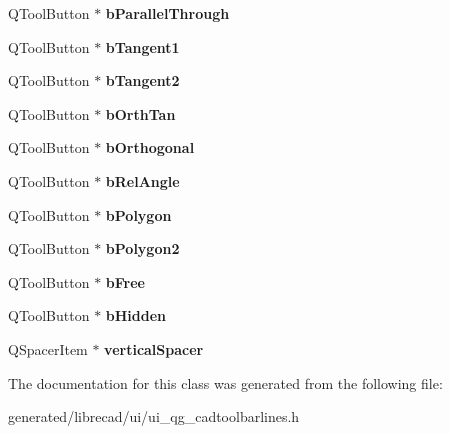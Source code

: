 \begin{DoxyCompactItemize}
\item 
\hypertarget{classUi__QG__CadToolBarLines_a97b59bf8eac8024b00acc25a7309fd08}{Q\-Tool\-Button $\ast$ {\bfseries b\-Parallel\-Through}}\label{classUi__QG__CadToolBarLines_a97b59bf8eac8024b00acc25a7309fd08}

\item 
\hypertarget{classUi__QG__CadToolBarLines_afc240331b0379d49489c3bef235bb491}{Q\-Tool\-Button $\ast$ {\bfseries b\-Tangent1}}\label{classUi__QG__CadToolBarLines_afc240331b0379d49489c3bef235bb491}

\item 
\hypertarget{classUi__QG__CadToolBarLines_a46fa22d7d353f8f2fa12a13513615312}{Q\-Tool\-Button $\ast$ {\bfseries b\-Tangent2}}\label{classUi__QG__CadToolBarLines_a46fa22d7d353f8f2fa12a13513615312}

\item 
\hypertarget{classUi__QG__CadToolBarLines_aeb0c7487faf56ab5ac0f88f3f0be7882}{Q\-Tool\-Button $\ast$ {\bfseries b\-Orth\-Tan}}\label{classUi__QG__CadToolBarLines_aeb0c7487faf56ab5ac0f88f3f0be7882}

\item 
\hypertarget{classUi__QG__CadToolBarLines_a3fe0ab2bc133eea4d28a8b8bf8d38625}{Q\-Tool\-Button $\ast$ {\bfseries b\-Orthogonal}}\label{classUi__QG__CadToolBarLines_a3fe0ab2bc133eea4d28a8b8bf8d38625}

\item 
\hypertarget{classUi__QG__CadToolBarLines_a2cc3cdddb2b33b193b6089c310471554}{Q\-Tool\-Button $\ast$ {\bfseries b\-Rel\-Angle}}\label{classUi__QG__CadToolBarLines_a2cc3cdddb2b33b193b6089c310471554}

\item 
\hypertarget{classUi__QG__CadToolBarLines_a71e8ada0d19008d1fc53be1546c31304}{Q\-Tool\-Button $\ast$ {\bfseries b\-Polygon}}\label{classUi__QG__CadToolBarLines_a71e8ada0d19008d1fc53be1546c31304}

\item 
\hypertarget{classUi__QG__CadToolBarLines_a71f23fd3a0e2e9e575b14fb75e317b1c}{Q\-Tool\-Button $\ast$ {\bfseries b\-Polygon2}}\label{classUi__QG__CadToolBarLines_a71f23fd3a0e2e9e575b14fb75e317b1c}

\item 
\hypertarget{classUi__QG__CadToolBarLines_a5cce311f2d5961348d64622fa9f4b21a}{Q\-Tool\-Button $\ast$ {\bfseries b\-Free}}\label{classUi__QG__CadToolBarLines_a5cce311f2d5961348d64622fa9f4b21a}

\item 
\hypertarget{classUi__QG__CadToolBarLines_a2c1830d62d80932669ab7c8edf9e2792}{Q\-Tool\-Button $\ast$ {\bfseries b\-Hidden}}\label{classUi__QG__CadToolBarLines_a2c1830d62d80932669ab7c8edf9e2792}

\item 
\hypertarget{classUi__QG__CadToolBarLines_a9f782e882611226bc10b88e51dc368d8}{Q\-Spacer\-Item $\ast$ {\bfseries vertical\-Spacer}}\label{classUi__QG__CadToolBarLines_a9f782e882611226bc10b88e51dc368d8}

\end{DoxyCompactItemize}


The documentation for this class was generated from the following file\-:\begin{DoxyCompactItemize}
\item 
generated/librecad/ui/ui\-\_\-qg\-\_\-cadtoolbarlines.\-h\end{DoxyCompactItemize}
